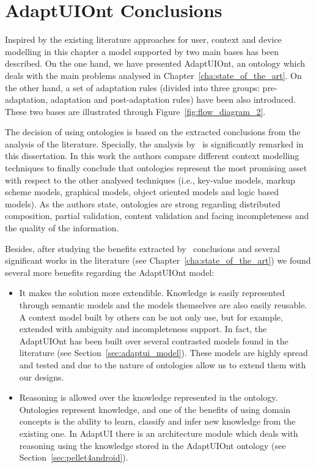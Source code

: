 \section{AdaptUIOnt Conclusions}
\label{sec:adaptui_conclusions}

Inspired by the existing literature approaches for user, context and device
modelling in this chapter a model supported by two main bases has been described.
On the one hand, we have presented AdaptUIOnt, an ontology which deals with the
main problems analysed in Chapter~\ref{cha:state_of_the_art}. On the other hand,
a set of adaptation rules (divided into three groups: pre-adaptation, adaptation
and post-adaptation rules) have been also introduced. These two bases are
illustrated through Figure~\ref{fig:flow_diagram_2}.

The decision of using ontologies is based on the extracted conclusions from the
analysis of the literature. Specially, the analysis by~\citet{strang_context_2004}
is significantly remarked in this dissertation. In this work the authors compare
different context modelling techniques to finally conclude that ontologies
represent the most promising asset with respect to the other analysed techniques
(i.e., key-value models, markup scheme models, graphical models, object oriented
models and logic based models). As the authors state, ontologies are strong
regarding distributed composition, partial validation, content validation
and facing incompleteness and the quality of the information.

Besides, after studying the benefits extracted by~\citet{strang_context_2004}
conclusions and several significant works in the literature (see
Chapter~\ref{cha:state_of_the_art}) we found several more benefits regarding the
AdaptUIOnt model:

\begin{itemize}
  \item It makes the solution more extendible. Knowledge is easily represented
  through semantic models and the models themselves are also easily reusable.
  A context model built by others can be not only use, but for example, extended
  with ambiguity and incompleteness support. In fact, the AdaptUIOnt has been
  built over several contrasted models found in the literature (see
  Section~\ref{sec:adaptui_model}). These models are highly spread and tested
  and due to the nature of ontologies allow us to extend them with our designs.
  
  \item Reasoning is allowed over the knowledge represented in the ontology.
  Ontologies represent knowledge, and one of the benefits of using domain
  concepts is the ability to learn, classify and infer new knowledge from the
  existing one. In AdaptUI there is an architecture module which deals with
  reasoning using the knowledge stored in the AdaptUIOnt ontology (see
  Section~\ref{sec:pellet4android}).
\end{itemize}



